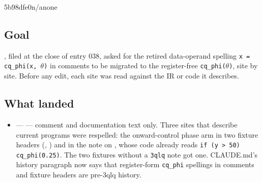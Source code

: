 %
  {5b98dfe0}{n/a}{none}

\subsection*{Goal}
, filed at the close of entry 038, asked for the retired
data-operand spelling \texttt{x = cq\_phi(x, $\theta$)} in comments to be migrated to the
register-free \texttt{cq\_phi($\theta$)}, site by site. Before any edit, each site was read
against the IR or code it describes.

\subsection*{What landed}
\begin{itemize}
  \item {} ---  --- comment and
  documentation text only. Three sites that describe current programs were respelled: the
  onward-control phase arm in two fixture headers
  (,
  ) and in the
   note on , whose code
  already reads \texttt{if (y > 50) cq\_phi(0.25)}. The two fixtures without a
  \texttt{3qlq} note got one. CLAUDE.md's history paragraph now says that
  register-form \texttt{cq\_phi} spellings in comments and fixture headers are pre-3qlq
  history.
\end{itemize}

